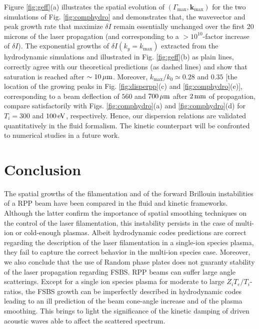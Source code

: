 \documentclass[
 reprint,
 superscriptaddress,
 amsmath,amssymb,
 aps,
]{revtex4-1}
\begin{document}
Figure \ref{fig:geff}(a) illustrates the spatial evolution of  $(\Gamma_\mathrm{max},\mathbf{k}_\mathrm{max})$ for the two simulations of Fig. \ref{fig:comphydro} and demonstrates that,   the wavevector and peak growth rate that maximize
$\delta I$ remain essentially unchanged over the first 20 microns of the laser propagation (and corresponding to a  $>10^{10}$-factor  increase of  $\delta I$). The exponential growths of $\delta I(k_y=k_\mathrm{max})$ extracted from the hydrodynamic simulations and illustrated in Fig. \ref{fig:geff}(b) as plain lines, correctly agree with our theoretical predictions (as dashed lines) and show that   saturation is reached after $\sim 10\,\rm\mu m$.
Moreover, $k_\mathrm{max}/k_0\simeq 0.28$ and $0.35$ [the location of the growing peaks in Fig. \ref{fig:disperpp}(c) and \ref{fig:comphydro}(e)], corresponding to a beam deflection  of $560$ and $700\,\rm\mu m$ after $2\,\rm mm$ of propagation, compare satisfactorily with Figs. \ref{fig:comphydro}(a) and \ref{fig:comphydro}(d) for $T_i=300$ and $100\, \rm eV$, respectively.
Hence, our dispersion relations are validated quantitatively in the fluid formalism. The kinetic counterpart will be confronted to numerical studies in a future work.

\section{Conclusion}
The spatial growths of the filamentation and of the forward Brillouin instabilities of a RPP beam have been compared in the fluid and kinetic frameworks. Although the latter confirm the importance  of spatial smoothing techniques on the control of the laser filamentation, this instability persists in the case of multi-ion  or cold-enough plasmas.
Albeit hydrodynamic codes predictions are correct regarding the description of the laser filamentation in a single-ion species plasma,
they fail to capture the correct behavior in the multi-ion species case. 
Moreover, we also conclude that the use of Random phase plates does not guaranty stability of the laser propagation regarding FSBS. RPP beams can suffer large angle scatterings.
Except for a single ion species plasma for moderate to large  $Z_iT_e/T_i$-ratios, the FSBS growth can be imperfectly described in hydrodynamic codes leading to an ill prediction of the beam cone-angle increase and of the plasma smoothing. 
This brings to light the significance of the kinetic damping of driven acoustic waves able to  affect the scattered spectrum.
\end{document}

